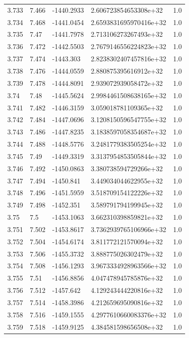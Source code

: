\begin{tabular}{lllll}
3.733 & 7.466 & -1440.2933 & 2.606723854653308e+32 & 1.0 \\
3.734 & 7.468 & -1441.0454 & 2.6593831695970416e+32 & 1.0 \\
3.735 & 7.47 & -1441.7978 & 2.713106273267493e+32 & 1.0 \\
3.736 & 7.472 & -1442.5503 & 2.7679146556224823e+32 & 1.0 \\
3.737 & 7.474 & -1443.303 & 2.8238302407457816e+32 & 1.0 \\
3.738 & 7.476 & -1444.0559 & 2.880875395616912e+32 & 1.0 \\
3.739 & 7.478 & -1444.8091 & 2.939072939058472e+32 & 1.0 \\
3.74 & 7.48 & -1445.5624 & 2.9984461508638165e+32 & 1.0 \\
3.741 & 7.482 & -1446.3159 & 3.059018781109365e+32 & 1.0 \\
3.742 & 7.484 & -1447.0696 & 3.1208150596547755e+32 & 1.0 \\
3.743 & 7.486 & -1447.8235 & 3.1838597058354687e+32 & 1.0 \\
3.744 & 7.488 & -1448.5776 & 3.2481779383505254e+32 & 1.0 \\
3.745 & 7.49 & -1449.3319 & 3.3137954853505844e+32 & 1.0 \\
3.746 & 7.492 & -1450.0863 & 3.380738594729266e+32 & 1.0 \\
3.747 & 7.494 & -1450.841 & 3.449034044622955e+32 & 1.0 \\
3.748 & 7.496 & -1451.5959 & 3.518709154122226e+32 & 1.0 \\
3.749 & 7.498 & -1452.351 & 3.589791794199945e+32 & 1.0 \\
3.75 & 7.5 & -1453.1063 & 3.662310398859821e+32 & 1.0 \\
3.751 & 7.502 & -1453.8617 & 3.7362939765106966e+32 & 1.0 \\
3.752 & 7.504 & -1454.6174 & 3.811772121570094e+32 & 1.0 \\
3.753 & 7.506 & -1455.3732 & 3.888775026302479e+32 & 1.0 \\
3.754 & 7.508 & -1456.1293 & 3.9673334928963566e+32 & 1.0 \\
3.755 & 7.51 & -1456.8856 & 4.047478945785876e+32 & 1.0 \\
3.756 & 7.512 & -1457.642 & 4.129243444220816e+32 & 1.0 \\
3.757 & 7.514 & -1458.3986 & 4.212659695090816e+32 & 1.0 \\
3.758 & 7.516 & -1459.1555 & 4.2977610660083376e+32 & 1.0 \\
3.759 & 7.518 & -1459.9125 & 4.384581598656508e+32 & 1.0 \\

\end{tabular}
